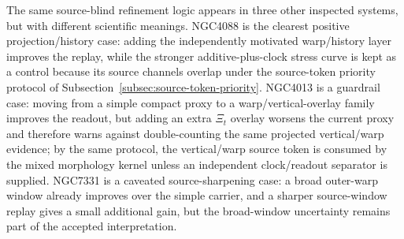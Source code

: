 \documentclass[11pt]{article}
\begin{document}
The same source-blind refinement logic appears in three other inspected
systems, but with different scientific meanings.  NGC4088 is the clearest
positive projection/history case: adding the independently motivated
warp/history layer improves the replay, while the stronger additive-plus-clock
stress curve is kept as a control because its source channels overlap under
the source-token priority protocol of
Subsection~\ref{subsec:source-token-priority}.
NGC4013 is a guardrail case: moving from a simple compact proxy to a
warp/vertical-overlay family improves the readout, but adding an extra
\(\Xi_t\) overlay worsens the current proxy and therefore warns against
double-counting the same projected vertical/warp evidence; by the same
protocol, the vertical/warp source token is consumed by the mixed morphology
kernel unless an independent clock/readout separator is supplied.  NGC7331 is a
caveated source-sharpening case: a broad outer-warp window already improves
over the simple carrier, and a sharper source-window replay gives a small
additional gain, but the broad-window uncertainty remains part of the
accepted interpretation.
\end{document}
